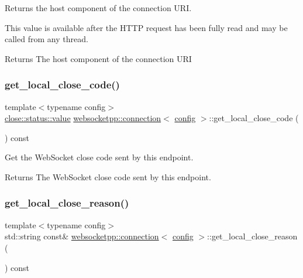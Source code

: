 Returns the host component of the connection U\+RI. 

This value is available after the H\+T\+TP request has been fully read and may be called from any thread.

\begin{DoxyReturn}{Returns}
The host component of the connection U\+RI 
\end{DoxyReturn}
\mbox{\label{classwebsocketpp_1_1connection_a871a1374bb7330126bfe3f535753cc52}} 
\subsubsection{\texorpdfstring{get\+\_\+local\+\_\+close\+\_\+code()}{get\_local\_close\_code()}}
{\footnotesize\ttfamily template$<$typename config$>$ \\
\mbox{\hyperlink{namespacewebsocketpp_1_1close_1_1status_a8614a5c4733d708e2d2a32191c5bef84}{close\+::status\+::value}} \mbox{\hyperlink{classwebsocketpp_1_1connection}{websocketpp\+::connection}}$<$ \mbox{\hyperlink{classconfig}{config}} $>$\+::get\+\_\+local\+\_\+close\+\_\+code (\begin{DoxyParamCaption}{ }\end{DoxyParamCaption}) const\hspace{0.3cm}{\ttfamily [inline]}}



Get the Web\+Socket close code sent by this endpoint. 

\begin{DoxyReturn}{Returns}
The Web\+Socket close code sent by this endpoint. 
\end{DoxyReturn}
\mbox{\label{classwebsocketpp_1_1connection_a5ac5746742be51cc68c15a8cfaf962c8}} 
\subsubsection{\texorpdfstring{get\+\_\+local\+\_\+close\+\_\+reason()}{get\_local\_close\_reason()}}
{\footnotesize\ttfamily template$<$typename config$>$ \\
std\+::string const\& \mbox{\hyperlink{classwebsocketpp_1_1connection}{websocketpp\+::connection}}$<$ \mbox{\hyperlink{classconfig}{config}} $>$\+::get\+\_\+local\+\_\+close\+\_\+reason (\begin{DoxyParamCaption}{ }\end{DoxyParamCaption}) const\hspace{0.3cm}{\ttfamily [inline]}}



